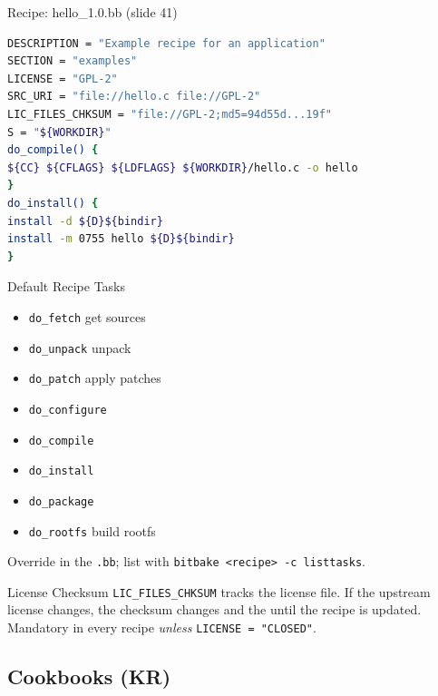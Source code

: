 \begin{examplecode}{Recipe: hello\_1.0.bb (slide 41)}
\begin{lstlisting}[language=bash, style=basesmol, aboveskip=2pt, belowskip=2pt]
DESCRIPTION = "Example recipe for an application"
SECTION = "examples"
LICENSE = "GPL-2"
SRC_URI = "file://hello.c file://GPL-2"
LIC_FILES_CHKSUM = "file://GPL-2;md5=94d55d...19f"
S = "${WORKDIR}"
do_compile() {
${CC} ${CFLAGS} ${LDFLAGS} ${WORKDIR}/hello.c -o hello
}
do_install() {
install -d ${D}${bindir}
install -m 0755 hello ${D}${bindir}
}
\end{lstlisting}
\end{examplecode}


\begin{corollary}{Default Recipe Tasks}
    \begin{itemize}
        \item \texttt{do\_fetch} get sources
        \item \texttt{do\_unpack} unpack
        \item \texttt{do\_patch} apply patches
        \item \texttt{do\_configure}
        \item \texttt{do\_compile}
        \item \texttt{do\_install}
        \item \texttt{do\_package}
        \item \texttt{do\_rootfs} build rootfs
    \end{itemize}
    Override in the \texttt{.bb}; list with \texttt{bitbake <recipe> -c listtasks}.
\end{corollary}

\begin{remark2}{License Checksum}
    \texttt{LIC\_FILES\_CHKSUM} tracks the license file. If the upstream license
    changes, the checksum changes and the  until the recipe
    is updated. Mandatory in every recipe \emph{unless} \texttt{LICENSE = "CLOSED"}.
\end{remark2}

\multend

\subsection{Cookbooks (KR)}


